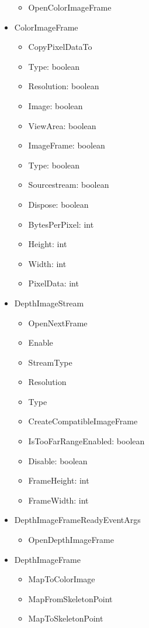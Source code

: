 \documentclass[11pt,a4paper]{article}
\begin{document}
\begin{itemize}
\begin{itemize}
	\item OpenColorImageFrame 	
	\end{itemize}		
\item ColorImageFrame
	\begin{itemize}
	\item CopyPixelDataTo
	\item Type: boolean
	\item Resolution: boolean
	\item Image: boolean
	\item ViewArea: boolean
	\item ImageFrame: boolean
	\item Type: boolean
	\item Sourcestream: boolean 
	\item Dispose: boolean
	\item BytesPerPixel: int
	\item Height: int
	\item Width: int
	\item PixelData: int
	\end{itemize}	
\item DepthImageStream
	\begin{itemize}
	\item OpenNextFrame
	\item Enable
	\item StreamType
	\item Resolution	
	\item Type
	\item CreateCompatibleImageFrame
	\item IsTooFarRangeEnabled: boolean
	\item Disable: boolean
	\item FrameHeight: int
	\item FrameWidth: int
	\end{itemize}
\item DepthImageFrameReadyEventArgs
	\begin{itemize}
	\item OpenDepthImageFrame
	\end{itemize}
\item DepthImageFrame
	\begin{itemize}
	\item MapToColorImage
	\item MapFromSkeletonPoint
	\item MapToSkeletonPoint

\end{itemize}
\end{itemize}
\end{document}

